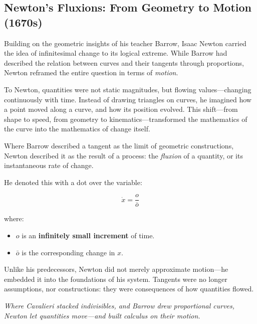 \subsection{Newton’s Fluxions: From Geometry to Motion (1670s)}

Building on the geometric insights of his teacher Barrow, Isaac Newton carried the idea of infinitesimal change to its logical extreme. While Barrow had described the relation between curves and their tangents through proportions, Newton reframed the entire question in terms of \textit{motion}.

To Newton, quantities were not static magnitudes, but flowing values—changing continuously with time. Instead of drawing triangles on curves, he imagined how a point moved along a curve, and how its position evolved. This shift—from shape to speed, from geometry to kinematics—transformed the mathematics of the curve into the mathematics of change itself.

Where Barrow described a tangent as the limit of geometric constructions, Newton described it as the result of a process: the \textit{fluxion} of a quantity, or its instantaneous rate of change.

\vspace{1em}

He denoted this with a dot over the variable:

\[
\dot{x} = \frac{o}{\bar{o}}
\]

where:

\begin{itemize}
    \item \( o \) is an \textbf{infinitely small increment} of time.  
    \item \( \bar{o} \) is the corresponding change in \( x \).
\end{itemize}

Unlike his predecessors, Newton did not merely approximate motion—he embedded it into the foundations of his system. Tangents were no longer assumptions, nor constructions: they were consequences of how quantities flowed.

\vspace{0.5em}

\textit{Where Cavalieri stacked indivisibles, and Barrow drew proportional curves, Newton let quantities move—and built calculus on their motion.}


